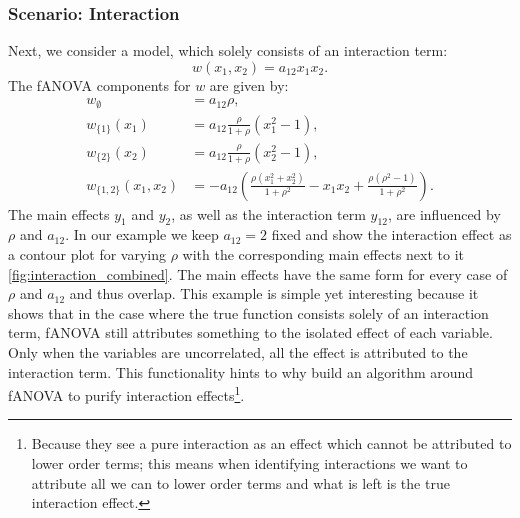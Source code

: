 \subsubsection{Scenario: Interaction}
Next, we consider a model, which solely consists of an interaction term:
$$w(x_1, x_2) = a_{12} x_1 x_2.$$
The fANOVA components for $w$ are given by:
\begin{align*}
    w_{\emptyset} &= a_{12} \rho, \\
    w_{\{1\}}(x_1) &= a_{12} \frac{\rho}{1+ \rho} (x_1^2 - 1), \\
    w_{\{2\}}(x_2) &= a_{12} \frac{\rho}{1+ \rho} (x_2^2 - 1), \\
    w_{\{1,2\}}(x_1,x_2) 
&= -a_{12}\!\left(
    \frac{\rho(x_1^2+x_2^2)}{1+\rho^2} 
    - x_1 x_2 
    + \frac{\rho(\rho^2-1)}{1+\rho^2}
   \right).
\end{align*}
The main effects $y_1$ and $y_2$, as well as the interaction term $y_{12}$, are influenced by $\rho$ and $a_{12}$.
In our example we keep $a_{12} = 2$ fixed and show the interaction effect as a contour plot for varying $\rho$ with the corresponding main effects next to it \autoref{fig:interaction_combined}.
The main effects have the same form for every case of $\rho$ and $a_{12}$ and thus overlap. This example is simple yet interesting because it shows that in the case where the true function consists solely of an interaction term, fANOVA still attributes something to the isolated effect of each variable. Only when the variables are uncorrelated, all the effect is attributed to the interaction term. This functionality hints to why \cite{lengerich2020} build an algorithm around fANOVA to purify interaction effects\footnote{Because they see a pure interaction as an effect which cannot be attributed to lower order terms; this means when identifying interactions we want to attribute all we can to lower order terms and what is left is the true interaction effect.}.


